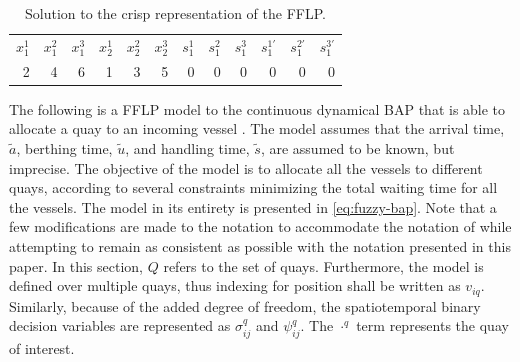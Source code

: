 \documentclass[ee,thesis]{usuthesis}
\begin{document}
\begin{table}[htbp]
\caption{\label{tab:fflp-example-solution}Solution to the crisp representation of the FFLP.}
\centering
\begin{tabular}{rrrrrrrrrrrr}
\(x_1^1\) & \(x_1^2\) & \(x_1^3\) & \(x_2^1\) & \(x_2^2\) & \(x_2^3\) & \(s_1^1\) & \(s_1^2\) & \(s_1^3\) & \(s_1^{1'}\) & \(s_1^{2'}\) & \(s_1^{3'}\)\\[0pt]
2 & 4 & 6 & 1 & 3 & 5 & 0 & 0 & 0 & 0 & 0 & 0\\[0pt]
\end{tabular}
\end{table}

\label{sec:the-fuzzy-bap}
The following is a FFLP model to the continuous dynamical BAP that is able to allocate a quay to an incoming vessel
\cite{bello-2019-fuzzy-activ}. The model assumes that the arrival time, \(\tilde{a}\), berthing time, \(\tilde{u}\), and
handling time, \(\tilde{s}\), are assumed to be known, but imprecise. The objective of the model is to allocate all the
vessels to different quays, according to several constraints minimizing the total waiting time for all the vessels. The
model in its entirety is presented in \ref{eq:fuzzy-bap}. Note that a few modifications are made to the notation to
accommodate the notation of \cite{bello-2019-fuzzy-activ} while attempting to remain as consistent as possible with the
notation presented in this paper. In this section, \(Q\) refers to the set of quays. Furthermore, the model is defined
over multiple quays, thus indexing for position shall be written as \(v_{iq}\). Similarly, because of the added degree of
freedom, the spatiotemporal binary decision variables are represented as \(\sigma^q_{ij}\) and \(\psi^q_{ij}\). The \(\cdot^q\) term
represents the quay of interest.
\end{document}
